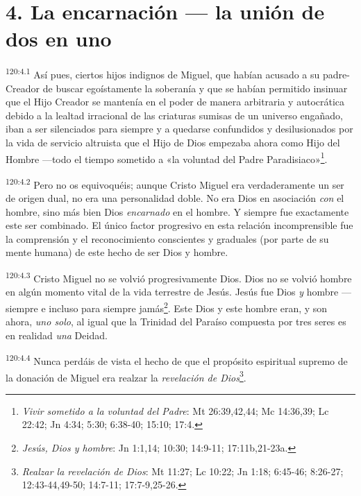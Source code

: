 \section*{4. La encarnación --- la unión de dos en uno}
\par 
\textsuperscript{120:4.1} Así pues, ciertos hijos indignos de Miguel, que habían acusado a su padre-Creador de buscar egoístamente la soberanía y que se habían permitido insinuar que el Hijo Creador se mantenía en el poder de manera arbitraria y autocrática debido a la lealtad irracional de las criaturas sumisas de un universo engañado, iban a ser silenciados para siempre y a quedarse confundidos y desilusionados por la vida de servicio altruista que el Hijo de Dios empezaba ahora como Hijo del Hombre ---todo el tiempo sometido a «la voluntad del Padre Paradisiaco»\footnote{\textit{Vivir sometido a la voluntad del Padre}: Mt 26:39,42,44; Mc 14:36,39; Lc 22:42; Jn 4:34; 5:30; 6:38-40; 15:10; 17:4.}.

\par 
\textsuperscript{120:4.2} Pero no os equivoquéis; aunque Cristo Miguel era verdaderamente un ser de origen dual, no era una personalidad doble. No era Dios en asociación \textit{con} el hombre, sino más bien Dios \textit{encarnado} en el hombre. Y siempre fue exactamente este ser combinado. El único factor progresivo en esta relación incomprensible fue la comprensión y el reconocimiento conscientes y graduales (por parte de su mente humana) de este hecho de ser Dios y hombre.

\par 
\textsuperscript{120:4.3} Cristo Miguel no se volvió progresivamente Dios. Dios no se volvió hombre en algún momento vital de la vida terrestre de Jesús. Jesús fue Dios \textit{y} hombre ---siempre e incluso para siempre jamás\footnote{\textit{Jesús, Dios y hombre}: Jn 1:1,14; 10:30; 14:9-11; 17:11b,21-23a.}. Este Dios y este hombre eran, y son ahora, \textit{uno solo}, al igual que la Trinidad del Paraíso compuesta por tres seres es en realidad \textit{una} Deidad.

\par 
\textsuperscript{120:4.4} Nunca perdáis de vista el hecho de que el propósito espiritual supremo de la donación de Miguel era realzar la \textit{revelación de Dios}\footnote{\textit{Realzar la revelación de Dios}: Mt 11:27; Lc 10:22; Jn 1:18; 6:45-46; 8:26-27; 12:43-44,49-50; 14:7-11; 17:7-9,25-26.}.


